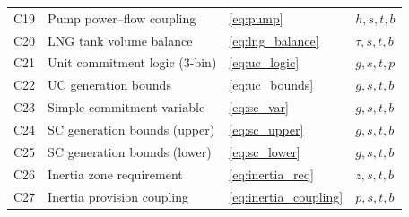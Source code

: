 \begin{table}[t]
\begin{tabular}{@{}clll@{}}
C19 & Pump power--flow coupling     & \eqref{eq:pump}             & $h,s,t,b$ \\
C20 & LNG tank volume balance       & \eqref{eq:lng_balance}      & $\tau,s,t,b$ \\
C21 & Unit commitment logic (3-bin) & \eqref{eq:uc_logic}         & $g,s,t,p$ \\
C22 & UC generation bounds          & \eqref{eq:uc_bounds}        & $g,s,t,b$ \\
C23 & Simple commitment variable    & \eqref{eq:sc_var}           & $g,s,t,b$ \\
C24 & SC generation bounds (upper)  & \eqref{eq:sc_upper}         & $g,s,t,b$ \\
C25 & SC generation bounds (lower)  & \eqref{eq:sc_lower}         & $g,s,t,b$ \\
C26 & Inertia zone requirement      & \eqref{eq:inertia_req}      & $z,s,t,b$ \\
C27 & Inertia provision coupling    & \eqref{eq:inertia_coupling} & $p,s,t,b$ \\
\bottomrule
\end{tabular}
\end{table}
